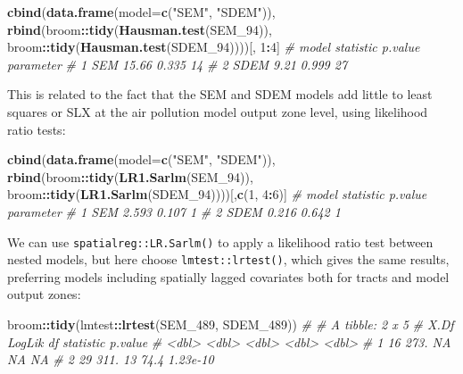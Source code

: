 \documentclass[]{book}
\newenvironment{Shaded}{\begin{snugshade}}{\end{snugshade}}
\newcommand{\CommentTok}[1]{\textcolor[rgb]{0.56,0.35,0.01}{\textit{#1}}}
\newcommand{\DataTypeTok}[1]{\textcolor[rgb]{0.13,0.29,0.53}{#1}}
\newcommand{\DecValTok}[1]{\textcolor[rgb]{0.00,0.00,0.81}{#1}}
\newcommand{\KeywordTok}[1]{\textcolor[rgb]{0.13,0.29,0.53}{\textbf{#1}}}
\newcommand{\NormalTok}[1]{#1}
\newcommand{\OperatorTok}[1]{\textcolor[rgb]{0.81,0.36,0.00}{\textbf{#1}}}
\newcommand{\StringTok}[1]{\textcolor[rgb]{0.31,0.60,0.02}{#1}}
\begin{document}
\begin{Shaded}
\begin{Highlighting}[]
\KeywordTok{cbind}\NormalTok{(}\KeywordTok{data.frame}\NormalTok{(}\DataTypeTok{model=}\KeywordTok{c}\NormalTok{(}\StringTok{"SEM"}\NormalTok{, }\StringTok{"SDEM"}\NormalTok{)), }
      \KeywordTok{rbind}\NormalTok{(broom}\OperatorTok{::}\KeywordTok{tidy}\NormalTok{(}\KeywordTok{Hausman.test}\NormalTok{(SEM_}\DecValTok{94}\NormalTok{)), }
\NormalTok{            broom}\OperatorTok{::}\KeywordTok{tidy}\NormalTok{(}\KeywordTok{Hausman.test}\NormalTok{(SDEM_}\DecValTok{94}\NormalTok{))))[, }\DecValTok{1}\OperatorTok{:}\DecValTok{4}\NormalTok{]}
\CommentTok{#   model statistic p.value parameter}
\CommentTok{# 1   SEM     15.66   0.335        14}
\CommentTok{# 2  SDEM      9.21   0.999        27}
\end{Highlighting}
\end{Shaded}

This is related to the fact that the SEM and SDEM models add little to least squares or SLX at the air pollution model output zone level, using likelihood ratio tests:

\begin{Shaded}
\begin{Highlighting}[]
\KeywordTok{cbind}\NormalTok{(}\KeywordTok{data.frame}\NormalTok{(}\DataTypeTok{model=}\KeywordTok{c}\NormalTok{(}\StringTok{"SEM"}\NormalTok{, }\StringTok{"SDEM"}\NormalTok{)), }\KeywordTok{rbind}\NormalTok{(broom}\OperatorTok{::}\KeywordTok{tidy}\NormalTok{(}\KeywordTok{LR1.Sarlm}\NormalTok{(SEM_}\DecValTok{94}\NormalTok{)),}
\NormalTok{    broom}\OperatorTok{::}\KeywordTok{tidy}\NormalTok{(}\KeywordTok{LR1.Sarlm}\NormalTok{(SDEM_}\DecValTok{94}\NormalTok{))))[,}\KeywordTok{c}\NormalTok{(}\DecValTok{1}\NormalTok{, }\DecValTok{4}\OperatorTok{:}\DecValTok{6}\NormalTok{)]}
\CommentTok{#   model statistic p.value parameter}
\CommentTok{# 1   SEM     2.593   0.107         1}
\CommentTok{# 2  SDEM     0.216   0.642         1}
\end{Highlighting}
\end{Shaded}

We can use \texttt{spatialreg::LR.Sarlm()} to apply a likelihood ratio test between nested models, but here choose \texttt{lmtest::lrtest()}, which gives the same results, preferring models including spatially lagged covariates both for tracts and model output zones:

\begin{Shaded}
\begin{Highlighting}[]
\NormalTok{broom}\OperatorTok{::}\KeywordTok{tidy}\NormalTok{(lmtest}\OperatorTok{::}\KeywordTok{lrtest}\NormalTok{(SEM_}\DecValTok{489}\NormalTok{, SDEM_}\DecValTok{489}\NormalTok{))}
\CommentTok{# # A tibble: 2 x 5}
\CommentTok{#    X.Df LogLik    df statistic   p.value}
\CommentTok{#   <dbl>  <dbl> <dbl>     <dbl>     <dbl>}
\CommentTok{# 1    16   273.    NA      NA   NA       }
\CommentTok{# 2    29   311.    13      74.4  1.23e-10}
\end{Highlighting}
\end{Shaded}
\end{document}

